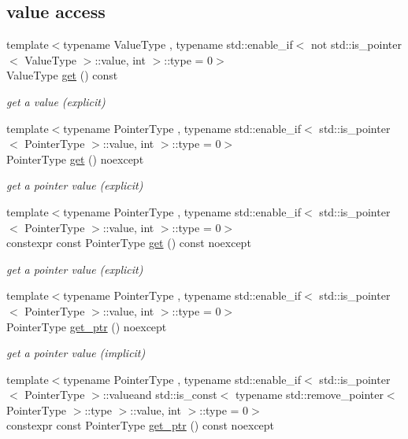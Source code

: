 \subsection*{value access}
\begin{DoxyCompactItemize}
\item 
{\footnotesize template$<$typename Value\-Type , typename std\-::enable\-\_\-if$<$ not std\-::is\-\_\-pointer$<$ Value\-Type $>$\-::value, int $>$\-::type  = 0$>$ }\\Value\-Type \hyperlink{classnlohmann_1_1basic__json_a20bfb2ca6d4c421c74bb3e53328cd437}{get} () const 
\begin{DoxyCompactList}\small\item\em get a value (explicit) \end{DoxyCompactList}\item 
{\footnotesize template$<$typename Pointer\-Type , typename std\-::enable\-\_\-if$<$ std\-::is\-\_\-pointer$<$ Pointer\-Type $>$\-::value, int $>$\-::type  = 0$>$ }\\Pointer\-Type \hyperlink{classnlohmann_1_1basic__json_ac5693cff1df0775cd3fbe960412cde4b}{get} () noexcept
\begin{DoxyCompactList}\small\item\em get a pointer value (explicit) \end{DoxyCompactList}\item 
{\footnotesize template$<$typename Pointer\-Type , typename std\-::enable\-\_\-if$<$ std\-::is\-\_\-pointer$<$ Pointer\-Type $>$\-::value, int $>$\-::type  = 0$>$ }\\constexpr const Pointer\-Type \hyperlink{classnlohmann_1_1basic__json_a9008c688b9bd5798e4090c971d20ee92}{get} () const noexcept
\begin{DoxyCompactList}\small\item\em get a pointer value (explicit) \end{DoxyCompactList}\item 
{\footnotesize template$<$typename Pointer\-Type , typename std\-::enable\-\_\-if$<$ std\-::is\-\_\-pointer$<$ Pointer\-Type $>$\-::value, int $>$\-::type  = 0$>$ }\\Pointer\-Type \hyperlink{classnlohmann_1_1basic__json_a7ab11375ed2e29c2fcb6119386851445}{get\-\_\-ptr} () noexcept
\begin{DoxyCompactList}\small\item\em get a pointer value (implicit) \end{DoxyCompactList}\item 
{\footnotesize template$<$typename Pointer\-Type , typename std\-::enable\-\_\-if$<$ std\-::is\-\_\-pointer$<$ Pointer\-Type $>$\-::valueand std\-::is\-\_\-const$<$ typename std\-::remove\-\_\-pointer$<$ Pointer\-Type $>$\-::type $>$\-::value, int $>$\-::type  = 0$>$ }\\constexpr const Pointer\-Type \hyperlink{classnlohmann_1_1basic__json_a9780ea9bb66b6191cb087b14396972c1}{get\-\_\-ptr} () const noexcept

\end{DoxyCompactItemize}
